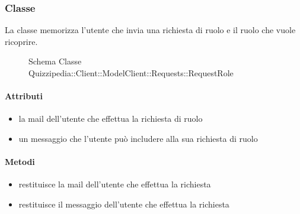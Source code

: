 \subsubsection{Classe }
La classe memorizza l'utente che invia una richiesta di ruolo e il ruolo che vuole ricoprire.
\begin{figure}[H]
\centering
\noindent{}
\caption[Schema Classe RequestRole]{Schema Classe Quizzipedia::Client::ModelClient::Requests::RequestRole}
\end{figure}
\paragraph{Attributi}
\begin{itemize}
\item {}
\newline
la mail dell'utente che effettua la richiesta di ruolo
\item {}
\newline
un messaggio che l'utente può includere alla sua richiesta di ruolo
\end{itemize}
\paragraph{Metodi}
\begin{itemize}
\item {}
\newline
restituisce la mail dell'utente che effettua la richiesta
\newline
\item {}
\newline
restituisce il messaggio dell'utente che effettua la richiesta
\newline
\end{itemize}
